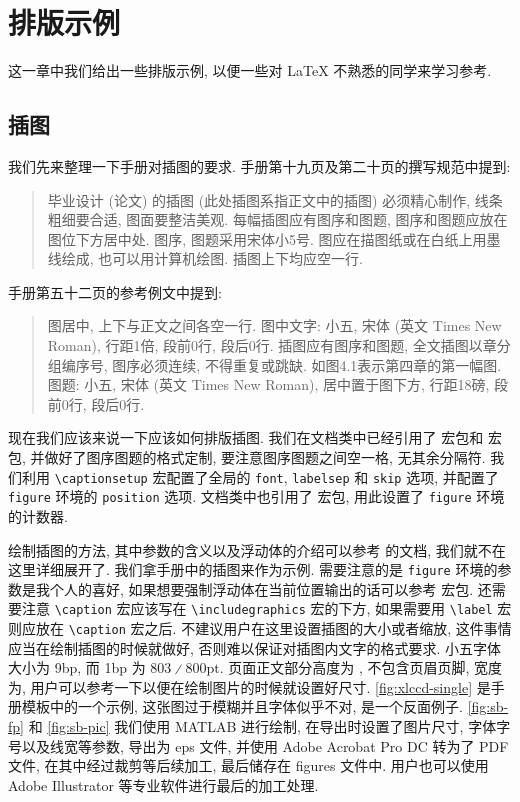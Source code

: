 
\section{排版示例}

这一章中我们给出一些排版示例, 以便一些对 {\LaTeX} 不熟悉的同学来学习参考.

\subsection{插图}

我们先来整理一下手册对插图的要求. 手册第十九页及第二十页的撰写规范中提到:
\begin{quote}
  毕业设计 (论文) 的插图 (此处插图系指正文中的插图) 必须精心制作, 线条粗细要合适, 图面要整洁美观. 每幅插图应有图序和图题, 图序和图题应放在图位下方居中处. 图序, 图题采用宋体小5号. 图应在描图纸或在白纸上用墨线绘成, 也可以用计算机绘图. 插图上下均应空一行.
\end{quote}
手册第五十二页的参考例文中提到:
\begin{quote}
  图居中, 上下与正文之间各空一行.
  图中文字: 小五, 宋体 (英文 Times New Roman), 行距1倍, 段前0行, 段后0行.
  插图应有图序和图题, 全文插图以章分组编序号, 图序必须连续, 不得重复或跳缺. 如图4.1表示第四章的第一幅图.
  图题: 小五, 宋体 (英文 Times New Roman), 居中置于图下方, 行距18磅, 段前0行, 段后0行.
\end{quote}

现在我们应该来说一下应该如何排版插图. 我们在文档类中已经引用了  宏包\footnotemark 和  宏包, 并做好了图序图题的格式定制, 要注意图序图题之间空一格, 无其余分隔符. 我们利用 \verb|\captionsetup| 宏配置了全局的 \verb|font|, \verb|labelsep| 和 \verb|skip| 选项, 并配置了 \verb|figure| 环境的 \verb|position| 选项. 文档类中也引用了  宏包, 用此设置了 \verb|figure| 环境的计数器.

绘制插图的方法, 其中参数的含义以及浮动体的介绍可以参考  的文档, 我们就不在这里详细展开了. 我们拿手册中的插图来作为示例. 需要注意的是 \verb|figure| 环境的参数是我个人的喜好, 如果想要强制浮动体在当前位置输出的话可以参考  宏包. 还需要注意 \verb|\caption| 宏应该写在 \verb|\includegraphics| 宏的下方, 如果需要用 \verb|\label| 宏则应放在 \verb|\caption| 宏之后. 不建议用户在这里设置插图的大小或者缩放, 这件事情应当在绘制插图的时候就做好, 否则难以保证对插图内文字的格式要求. 小五字体大小为 9bp, 而 1bp 为 $803{\divslash}800\text{pt}$\footnotemark . 页面正文部分高度为 \the\textheight, 不包含页眉页脚, 宽度为\the\textwidth, 用户可以参考一下以便在绘制图片的时候就设置好尺寸. \ref{fig:xlccd-single} 是手册模板中的一个示例, 这张图过于模糊并且字体似乎不对, 是一个反面例子. \ref{fig:sb-fp} 和 \ref{fig:sb-pic} 我们使用 MATLAB 进行绘制, 在导出时设置了图片尺寸, 字体字号以及线宽等参数, 导出为 eps 文件, 并使用 Adobe Acrobat Pro DC 转为了 PDF 文件, 在其中经过裁剪等后续加工, 最后储存在 figures 文件中. 用户也可以使用 Adobe Illustrator 等专业软件进行最后的加工处理.

